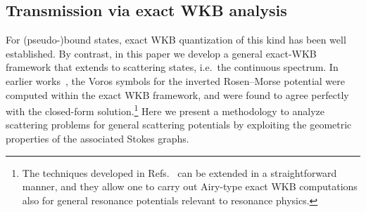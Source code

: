 \subsection{Transmission via exact WKB analysis}
For (pseudo-)bound states, exact WKB quantization of this kind has been well established. By contrast, in this paper we develop a general exact-WKB framework that extends to scattering states, i.e.\ the continuous spectrum.
In earlier works~\cite{Morikawa:2025grx,Morikawa:2025xjq}, the Voros symbols for the inverted Rosen--Morse potential were computed within the exact WKB framework, and were found to agree perfectly with the closed-form solution.\footnote{The techniques developed in Refs.~\cite{Morikawa:2025grx,Morikawa:2025xjq} can be extended in a straightforward manner, and they allow one to carry out Airy-type exact WKB computations also for general resonance potentials relevant to resonance physics.} Here we present a methodology to analyze scattering problems for general scattering potentials by exploiting the geometric properties of the associated Stokes graphs.

